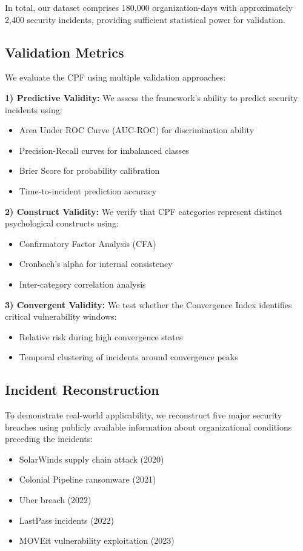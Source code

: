 \documentclass[10pt,twocolumn]{IEEEtran}
\begin{document}
In total, our dataset comprises 180,000 organization-days with approximately 2,400 security incidents, providing sufficient statistical power for validation.

\subsection{Validation Metrics}

We evaluate the CPF using multiple validation approaches:

\textbf{1) Predictive Validity:} We assess the framework's ability to predict security incidents using:
\begin{itemize}
\item Area Under ROC Curve (AUC-ROC) for discrimination ability
\item Precision-Recall curves for imbalanced classes
\item Brier Score for probability calibration
\item Time-to-incident prediction accuracy
\end{itemize}

\textbf{2) Construct Validity:} We verify that CPF categories represent distinct psychological constructs using:
\begin{itemize}
\item Confirmatory Factor Analysis (CFA)
\item Cronbach's alpha for internal consistency
\item Inter-category correlation analysis
\end{itemize}

\textbf{3) Convergent Validity:} We test whether the Convergence Index identifies critical vulnerability windows:
\begin{itemize}
\item Relative risk during high convergence states
\item Temporal clustering of incidents around convergence peaks
\end{itemize}

\subsection{Incident Reconstruction}

To demonstrate real-world applicability, we reconstruct five major security breaches using publicly available information about organizational conditions preceding the incidents:

\begin{itemize}
\item SolarWinds supply chain attack (2020)
\item Colonial Pipeline ransomware (2021)
\item Uber breach (2022)
\item LastPass incidents (2022)
\item MOVEit vulnerability exploitation (2023)
\end{itemize}
\end{document}
